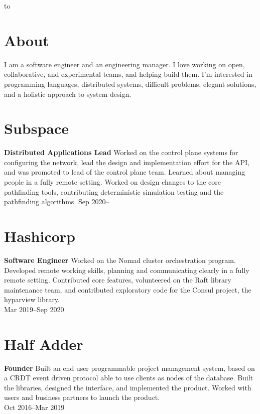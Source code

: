 \documentclass[margin]{res}
\begin{document}

\hbox to 

\begin{resume}
\section{About}

I am a software engineer and an engineering manager. I love working on
open, collaborative, and experimental teams, and helping build them.
I'm interested in programming languages, distributed systems,
difficult problems, elegant solutions, and a holistic approach to
system design.

\section{Subspace}
{\bf Distributed Applications Lead}
%
Worked on the control plane systems for configuring the network, lead
the design and implementation effort for the API, and was promoted to
lead of the control plane team. Learned about managing people in a
fully remote setting. Worked on design changes to the core pathfinding
tools, contributing deterministic simulation testing and the
pathfinding algorithms.
%
Sep 2020--

\section{Hashicorp}
{\bf Software Engineer}
%
Worked on the Nomad cluster orchestration program. Developed remote
working skills, planning and communicating clearly in a fully remote
setting. Contributed core features, volunteered on the Raft library
maintenance team, and contributed exploratory code for the Consul
project, the hyparview library.\\
%
Mar 2019--Sep 2020

\section{Half Adder}
{\bf Founder}
%
Built an end user programmable project management system, based on a
CRDT event driven protocol able to use clients as nodes of the
database. Built the libraries, designed the interface, and implemented
the product. Worked with users and business partners to launch the
product.\\
%
Oct 2016--Mar 2019


\end{resume}
\end{document}
